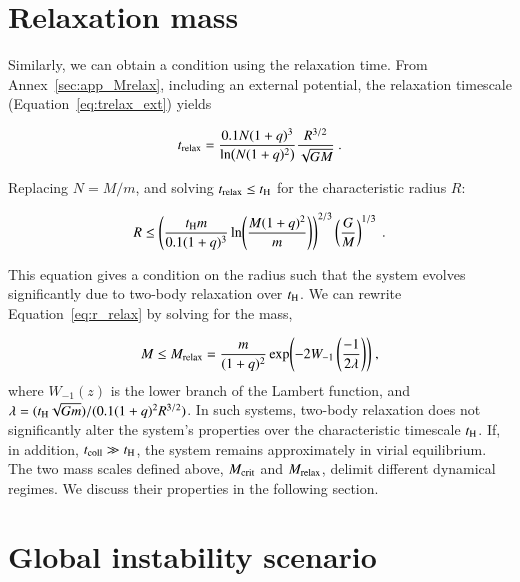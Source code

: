 \section{Relaxation mass}
\label{sec:2.1_Mrelax}

Similarly, we can obtain a condition using the relaxation time. From Annex~\ref{sec:app_Mrelax}, including an external potential, the relaxation timescale (Equation~\eqref{eq:trelax_ext}) yields

\begin{equation}
	t_{\rm relax} = \frac{0.1 N(1+q)^3}{\ln(N(1+q)^2)} \frac{R^{3/2}}{\sqrt{GM}}~.
\end{equation}

Replacing $N=M/m$, and solving $t_{\rm relax} \leq t_{\rm H}$ for the characteristic radius $R$:

\begin{equation}
	R \leq \left(\frac{t_{\rm H}m}{0.1(1+q)^3} \ln(\frac{M(1+q)^2}{m})\right)^{2/3} \left(\frac{G}{M}\right)^{1/3}~.
	\label{eq:r_relax}
\end{equation}

This equation gives a condition on the radius such that the system evolves significantly due to two-body relaxation over $t_{\rm H}$. We can rewrite Equation~\eqref{eq:r_relax} by solving for the mass,

\begin{equation}
	M \leq M_{\rm relax} = \frac{m}{(1+q)^2}\exp(-2 W_{-1}\left(\frac{-1}{2\lambda}\right))~,
	\label{eq:M_relax_ext}
\end{equation}
where $W_{-1}(z)$ is the lower branch of the Lambert function, and $\lambda = (t_{\rm H}\sqrt{Gm})/(0.1(1+q)^2R^{3/2})$. In such systems, two-body relaxation does not significantly alter the system's properties over the characteristic timescale $t_{\rm H}$. If, in addition, $t_{\rm coll} \gg t_{\rm H}$, the system remains approximately in virial equilibrium. The two mass scales defined above, $M_{\rm crit}$ and $M_{\rm relax}$, delimit different dynamical regimes. We discuss their properties in the following section.

\section{Global instability scenario}
\label{sec:instability_scenario}

